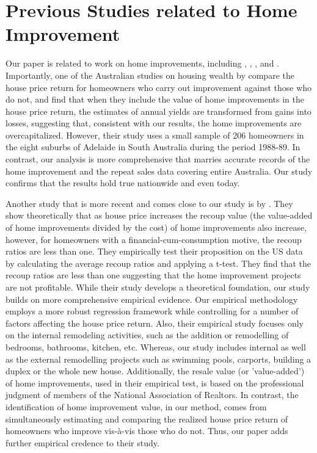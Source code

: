 \documentclass[AEJ,reqno, draftmode]{AEA} %
\begin{document}
\section{Previous Studies related to Home Improvement}

Our paper is related to work on home improvements, including \cite{badcock1994snakes}, \cite{choi2014speculating}, \cite{gyourko2004reinvestment}, \cite{helms2003understanding} and \cite{montgomery1992explaining}. Importantly, one of the Australian studies on housing wealth by \cite{badcock1994snakes} compare the house price return for homeowners who carry out improvement against those who do not, and find that when they include the value of home improvements in the house price return, the estimates of annual yields are transformed from gains into losses, suggesting that, consistent with our results, the home improvements are overcapitalized. However, their study uses a small sample of 206 homeowners in the eight suburbs of Adelaide in South Australia during the period 1988-89. In contrast, our analysis is more comprehensive that marries accurate records of the home improvement and the repeat sales data covering entire Australia. Our study confirms that the results hold true nationwide and even today.

Another study that is more recent and comes close to our study is by \citet{choi2014speculating}. They show theoretically that as house price increases the recoup value (the value-added of home improvements divided by the cost) of home improvements also increase, however, for homeowners with a financial-cum-consumption motive, the recoup ratios are less than one. They empirically test their proposition on the US data by calculating the average recoup ratios and applying a t-test. They find that the recoup ratios are less than one suggesting that the home improvement projects are not profitable. While their study develops a theoretical foundation, our study builds on more comprehensive empirical evidence. Our empirical methodology employs a more robust regression framework while controlling for a number of factors affecting the house price return. Also, their empirical study focuses only on the internal remodeling activities, such as the addition or remodelling of bedrooms, bathrooms, kitchen, etc. Whereas, our study includes internal as well as the external remodelling projects such as swimming pools, carports, building a duplex or the whole new house. Additionally, the resale value (or 'value-added') of home improvements, used in their empirical test, is based on the professional judgment of members of the National Association of Realtors. In contrast, the identification of home improvement value, in our method, comes from simultaneously estimating and comparing the realized house price return of homeowners who improve vis-à-vis those who do not. Thus, our paper adds further empirical credence to their study. 
\end{document}
